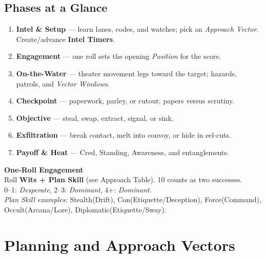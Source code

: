 \documentclass[11pt,oneside]{book}
\begin{document}
\subsection*{Phases at a Glance}
\begin{enumerate}[leftmargin=*,itemsep=2pt]
  \item \textbf{Intel \& Setup} --- learn lanes, codes, and watches; pick an \emph{Approach Vector}. Create/advance \textbf{Intel Timers}.
  \item \textbf{Engagement} --- one roll sets the opening \emph{Position} for the score.
  \item \textbf{On-the-Water} --- theater movement legs toward the target; hazards, patrols, and \emph{Vector Windows}.
  \item \textbf{Checkpoint} --- paperwork, parley, or cutout; papers versus scrutiny.
  \item \textbf{Objective} --- steal, swap, extract, signal, or sink.
  \item \textbf{Exfiltration} --- break contact, melt into convoy, or hide in eel-cuts.
  \item \textbf{Payoff \& Heat} --- Cred, Standing, Awareness, and entanglements.
\end{enumerate}

\begin{tcolorbox}[breakable]
\textbf{One-Roll Engagement}\\
Roll \textbf{Wits + Plan Skill} (see Approach Table). 10 counts as two successes.\\
0--1: \emph{Desperate}, 2--3: \emph{Dominant}, 4+: \emph{Dominant}.\\
\textit{Plan Skill examples:} Stealth(Drift), Con(Etiquette/Deception), Force(Command), Occult(Arcana/Lore), Diplomatic(Etiquette/Sway).
\end{tcolorbox}

\section{Planning and Approach Vectors}
\end{document}
